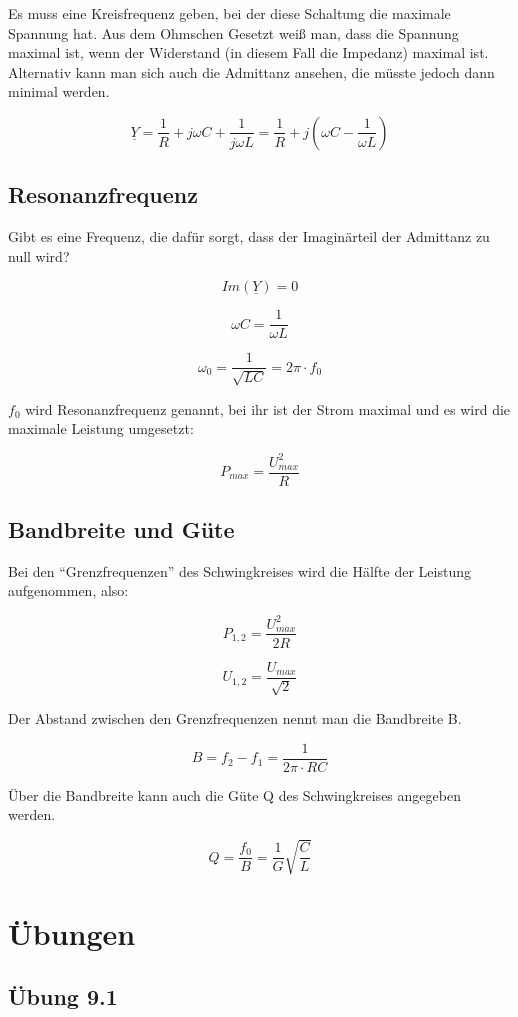 \documentclass[
  ngerman,
  letterpaper,
]{scrbook}
\begin{document}
Es muss eine Kreisfrequenz geben, bei der diese Schaltung die maximale
Spannung hat. Aus dem Ohmschen Gesetzt weiß man, dass die Spannung
maximal ist, wenn der Widerstand (in diesem Fall die Impedanz) maximal
ist. Alternativ kann man sich auch die Admittanz ansehen, die müsste
jedoch dann minimal werden.

\[\underline{Y} = \frac{1}{R} + j\omega C + \frac{1}{j\omega L} = \frac{1}{R} + j\left(\omega C - \frac{1}{\omega L}\right)\]

\subsection{Resonanzfrequenz}\label{resonanzfrequenz-2}

Gibt es eine Frequenz, die dafür sorgt, dass der Imaginärteil der
Admittanz zu null wird?

\[Im(\underline{Y}) = 0\]

\[\omega C = \frac{1}{\omega L}\]

\[\omega_0 = \frac{1}{\sqrt{LC}} = 2\pi \cdot f_0\]

\(f_0\) wird Resonanzfrequenz genannt, bei ihr ist der Strom maximal und
es wird die maximale Leistung umgesetzt:

\[P_{max} = \frac{U_{max}^2}{R}\]

\subsection{Bandbreite und Güte}\label{bandbreite-und-guxfcte-1}

Bei den ``Grenzfrequenzen'' des Schwingkreises wird die Hälfte der
Leistung aufgenommen, also:

\[P_{1,2} = \frac{U_{max}^2}{2R}\]

\[U_{1,2} = \frac{U_{max}}{\sqrt{2}}\]

Der Abstand zwischen den Grenzfrequenzen nennt man die Bandbreite B.

\[B = f_2 - f_1 = \frac{1}{2\pi \cdot RC}\]

Über die Bandbreite kann auch die Güte Q des Schwingkreises angegeben
werden.

\[Q = \frac{f_0}{B} = \frac{1}{G}\sqrt{\frac{C}{L}}\]

\section{Übungen}\label{uxfcbungen-6}

\subsection{Übung 9.1}\label{uxfcbung-9.1}
\end{document}
